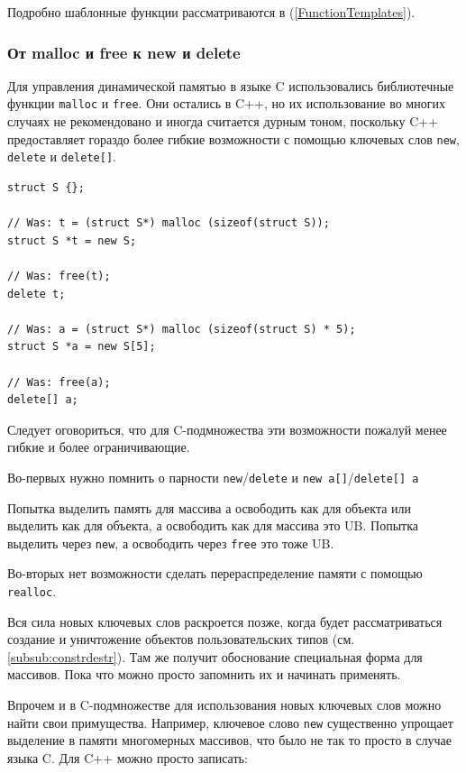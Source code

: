 \documentclass[a4paper,12pt,oneside]{article}
\begin{document}
Подробно шаблонные функции рассматриваются в (\ref{FunctionTemplates}).

\subsubsection{От malloc и free к new и delete}\label{subsub:newdelete}

Для управления динамической памятью в языке C использовались библиотечные функции \lstinline!malloc! и \lstinline!free!. Они остались в C++, но их использование во многих случаях не рекомендовано и иногда считается дурным тоном, поскольку C++ предоставляет гораздо более гибкие возможности с помощью ключевых слов \lstinline!new!, \lstinline!delete! и \lstinline!delete[]!.

\begin{lstlisting}
struct S {}; 

// Was: t = (struct S*) malloc (sizeof(struct S));
struct S *t = new S; 

// Was: free(t);
delete t; 

// Was: a = (struct S*) malloc (sizeof(struct S) * 5);
struct S *a = new S[5]; 

// Was: free(a);
delete[] a; 
\end{lstlisting}

Следует оговориться, что для C-подмножества эти возможности пожалуй менее гибкие и более ограничивающие.

Во-первых нужно помнить о парности \lstinline!new!/\lstinline!delete! и \lstinline!new a[]!/\lstinline!delete[] a!

Попытка выделить память для массива а освободить как для объекта или выделить как для объекта, а освободить как для массива это UB. Попытка выделить через \lstinline!new!, а освободить через \lstinline!free! это тоже UB.

Во-вторых нет возможности сделать перераспределение памяти с помощью \lstinline!realloc!.

Вся сила новых ключевых слов раскроется позже, когда будет рассматриваться создание и уничтожение объектов пользовательских типов (см. \ref{subsub:constrdestr}). Там же получит обоснование специальная форма для массивов. Пока что можно просто запомнить их и начинать применять.

Впрочем и в C-подмножестве для использования новых ключевых слов можно найти свои примущества. Например, ключевое слово \lstinline!new! существенно упрощает выделение в памяти многомерных массивов, что было не так то просто в случае языка C. Для C++ можно просто записать:
\end{document}
